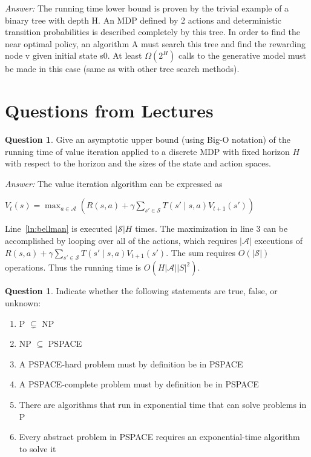 \documentclass{article}
\theoremstyle{definition}
\newtheorem{question}[thm]{Question}
\newenvironment{answer}{\noindent\textit{Answer:}}{}
\begin{document}
\begin{answer}
    The running time lower bound is proven by the trivial example of a binary tree with depth H.
An MDP defined by 2 actions and deterministic transition probabilities is described completely
by this tree. In order to find the near optimal policy, an algorithm A must search this tree
and find the rewarding node v given initial state s0. At least $\Omega(2^H)$ calls to the generative
model must be made in this case (same as with other tree search methods).
\end{answer}

\section{Questions from Lectures}

\begin{question}
    Give an asymptotic upper bound (using Big-O notation) of the running time of value iteration applied to a discrete MDP with fixed horizon $H$ with respect to the horizon and the sizes of the state and action spaces.
\end{question}

\begin{answer}
    The value iteration algorithm can be expressed as
    \begin{algorithmic}[1]
            \State $V_t(s) = \max_{a \in \mathcal{A}}\left(R(s, a) + \gamma \sum_{s'\in\mathcal{S}} T(s'\mid s, a) V_{t+1}(s')\right)$ \label{ln:bellman}
            \EndFor
        \EndFor
    \end{algorithmic}
    Line~\ref{ln:bellman} is executed $|\mathcal{S}| H$ times.
    The maximization in line 3 can be accomplished by looping over all of the actions, which requires $|\mathcal{A}|$ executions of $R(s, a) + \gamma \sum_{s'\in\mathcal{S}} T(s'\mid s, a) V_{t+1}(s')$. 
    The sum requires $O(|\mathcal{S}|)$ operations. Thus the running time is $O(H|\mathcal{A}||S|^2)$.
\end{answer}

\begin{question}
    Indicate whether the following statements are true, false, or unknown:
    \begin{enumerate}[label=\alph*)]
        \item P $\subsetneq$ NP
        \item NP $\subseteq$ PSPACE
        \item A PSPACE-hard problem must by definition be in PSPACE
        \item A PSPACE-complete problem must by definition be in PSPACE
        \item There are algorithms that run in exponential time that can solve problems in P
        \item Every abstract problem in PSPACE requires an exponential-time algorithm to solve it
    \end{enumerate}
\end{question}
\end{document}
